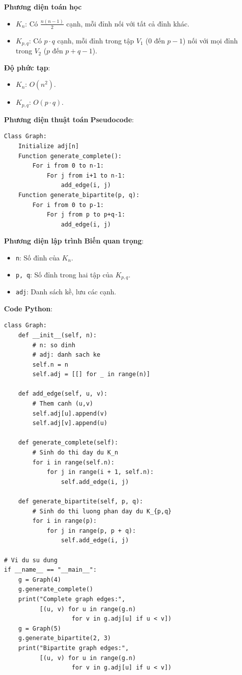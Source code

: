 \documentclass[a4paper,12pt]{article}
\begin{document}
\textbf{Phương diện toán học}
\begin{itemize}
    \item \textbf{\( K_n \)}: Có \( \frac{n(n-1)}{2} \) cạnh, mỗi đỉnh nối với tất cả đỉnh khác.
    \item \textbf{\( K_{p,q} \)}: Có \( p \cdot q \) cạnh, mỗi đỉnh trong tập \( V_1 \) (0 đến \( p-1 \)) nối với mọi đỉnh trong \( V_2 \) (\( p \) đến \( p+q-1 \)).
\end{itemize}

\textbf{Độ phức tạp}:
\begin{itemize}
    \item \( K_n \): \( O(n^2) \).
    \item \( K_{p,q} \): \( O(p \cdot q) \).
\end{itemize}

\textbf{Phương diện thuật toán}
\textbf{Pseudocode}:
\begin{verbatim}
Class Graph:
    Initialize adj[n]
    Function generate_complete():
        For i from 0 to n-1:
            For j from i+1 to n-1:
                add_edge(i, j)
    Function generate_bipartite(p, q):
        For i from 0 to p-1:
            For j from p to p+q-1:
                add_edge(i, j)
\end{verbatim}

\textbf{Phương diện lập trình}
\textbf{Biến quan trọng}:
\begin{itemize}
    \item \texttt{n}: Số đỉnh của \( K_n \).
    \item \texttt{p, q}: Số đỉnh trong hai tập của \( K_{p,q} \).
    \item \texttt{adj}: Danh sách kề, lưu các cạnh.
\end{itemize}

\textbf{Code Python}:
\lstset{language=Python}
\begin{lstlisting}
class Graph:
    def __init__(self, n):
        # n: so dinh
        # adj: danh sach ke
        self.n = n
        self.adj = [[] for _ in range(n)]

    def add_edge(self, u, v):
        # Them canh (u,v)
        self.adj[u].append(v)
        self.adj[v].append(u)

    def generate_complete(self):
        # Sinh do thi day du K_n
        for i in range(self.n):
            for j in range(i + 1, self.n):
                self.add_edge(i, j)

    def generate_bipartite(self, p, q):
        # Sinh do thi luong phan day du K_{p,q}
        for i in range(p):
            for j in range(p, p + q):
                self.add_edge(i, j)

# Vi du su dung
if __name__ == "__main__":
    g = Graph(4)
    g.generate_complete()
    print("Complete graph edges:", 
          [(u, v) for u in range(g.n) 
                   for v in g.adj[u] if u < v])
    g = Graph(5)
    g.generate_bipartite(2, 3)
    print("Bipartite graph edges:", 
          [(u, v) for u in range(g.n) 
                   for v in g.adj[u] if u < v])
\end{lstlisting}
\end{document}

